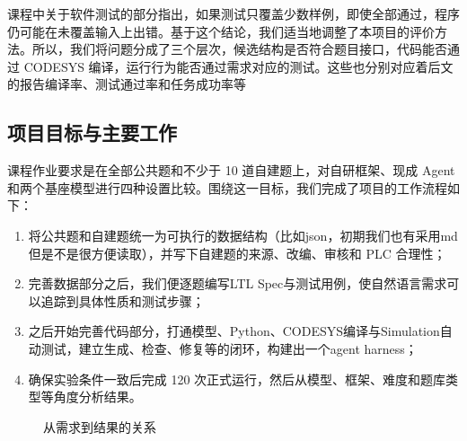 \documentclass[UTF8,a4paper,zihao=-4]{ctexart}
\begin{document}
课程中关于软件测试的部分指出，如果测试只覆盖少数样例，即使全部通过，程序仍可能在未覆盖输入上出错。基于这个结论，我们适当地调整了本项目的评价方法。所以，我们将问题分成了三个层次，候选结构是否符合题目接口，代码能否通过 CODESYS 编译，运行行为能否通过需求对应的测试。这些也分别对应着后文的报告编译率、测试通过率和任务成功率等

\subsection{项目目标与主要工作}
课程作业要求是在全部公共题和不少于 10 道自建题上，对自研框架、现成 Agent 和两个基座模型进行四种设置比较。围绕这一目标，我们完成了项目的工作流程如下：
\begin{enumerate}
  \item 将公共题和自建题统一为可执行的数据结构（比如json，初期我们也有采用md但是不是很方便读取），并写下自建题的来源、改编、审核和 PLC 合理性；
  \item 完善数据部分之后，我们便逐题编写LTL Spec与测试用例，使自然语言需求可以追踪到具体性质和测试步骤；
  \item 之后开始完善代码部分，打通模型、Python、CODESYS编译与Simulation自动测试，建立生成、检查、修复等的闭环，构建出一个agent harness；
  \item 确保实验条件一致后完成 120 次正式运行，然后从模型、框架、难度和题库类型等角度分析结果。
\end{enumerate}

\begin{figure}[H]
  \centering
  \caption{从需求到结果的关系}
  \label{fig:overview}
\end{figure}
\end{document}

